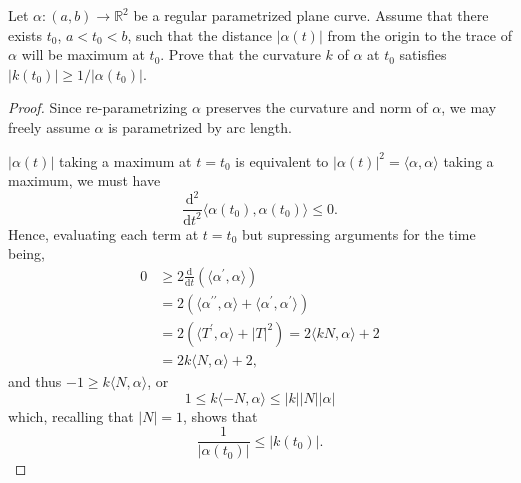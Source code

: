 \documentclass[12pt]{article}
\newenvironment{problem}[2][Problem]{\begin{trivlist}
    \item[\hskip \labelsep {\bfseries #1}\hskip \labelsep {\bfseries #2.}]}{\end{trivlist}}
\theoremstyle{definition}
\begin{document}
\begin{problem}{1.5.14}
  Let \(\alpha:(a,b) \rightarrow \mathbb{R}^2\) be a regular parametrized plane curve.
  Assume that there exists \( t_0 \), \( a < t_0 < b \), such that the distance \( \left| \alpha(t) \right| \) from the origin to the trace of \(\alpha\) will be maximum at \( t_{0} \).
  Prove that the curvature \( k \) of \(\alpha\) at \( t_0 \) satisfies \( \left| k(t_0) \right| \geq 1/\left| \alpha(t_0) \right|\).
\end{problem}
\begin{proof}
  Since re-parametrizing \( \alpha \) preserves the curvature and norm of \(\alpha\), we may freely assume \(\alpha\) is parametrized by arc length.

  \(\left| \alpha(t) \right|\) taking a maximum at \( t=t_0 \) is equivalent to \( \left| \alpha(t) \right|^2 = \langle \alpha, \alpha \rangle \) taking a maximum, we must have
  \begin{equation}
  \label{eq:20}
  \frac{\mathrm{d}^2 }{\mathrm{d} t^2} \langle \alpha(t_0), \alpha(t_{0}) \rangle \leq 0.
  \end{equation}
  Hence, evaluating each term at \( t=t_0 \) but supressing arguments for the time being,
  \begin{align}
  \label{eq:21}
    0 &\geq 2\frac{\mathrm{d} }{\mathrm{d} t} \left( \langle\alpha^{\prime}, \alpha \rangle \right) \\
      &= 2 \left( \langle\alpha^{\prime\prime}, \alpha \rangle + \langle \alpha^{\prime}, \alpha^{\prime} \rangle \right) \\
      &= 2 \left( \langle T^{\prime}, \alpha \rangle + | T |^2 \right) = 2\langle kN , \alpha \rangle + 2 \\
    &= 2k \langle N , \alpha \rangle + 2,
  \end{align}
  and thus \(-1 \geq k \langle N, \alpha \rangle\), or
  \begin{equation}
  \label{eq:25}
  1 \leq k \langle -N, \alpha \rangle \leq |k| |N| |\alpha|
  \end{equation}
  which, recalling that \( |N| = 1 \), shows that
  \begin{equation}
  \label{eq:26}
  \frac{1}{|\alpha(t_0)|} \leq |k(t_0)|.
  \end{equation}
\end{proof}
\end{document}
